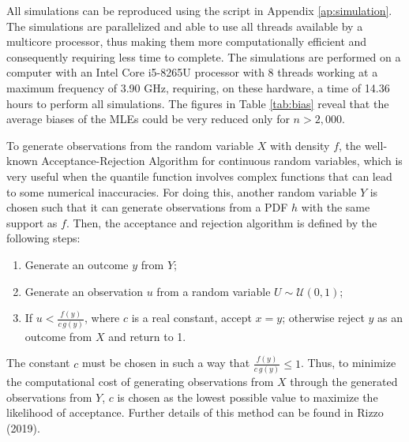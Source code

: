 \documentclass[twoside,leqno,11pt]{article}
\begin{document}
All simulations can be reproduced using the script in Appendix \ref{ap:simulation}. The simulations are parallelized and able to use all threads
available by a multicore processor, thus making them more computationally efficient and consequently requiring less time to complete.
The simulations are performed on a computer with an Intel Core i5-8265U processor with 8 threads working at a maximum frequency of 3.90 GHz,
requiring, on these hardware, a time of 14.36 hours to perform all simulations. The figures in Table \ref{tab:bias} reveal that the average
biases of the MLEs could be very reduced only for $n> 2,000$.

To generate observations from the random variable $X$ with density $f$, the well-known Acceptance-Rejection Algorithm for continuous random variables, which is very useful when the quantile function involves complex functions that can lead to some numerical inaccuracies. For doing this, another random variable $Y$ is chosen such that it can generate observations from a PDF $h$ with the same support as $f$. Then, the acceptance and rejection algorithm is defined by the following steps:
\begin{enumerate}
	\item Generate an outcome $y$ from $Y$;
	\item Generate an observation $u$ from a random variable $U\sim \mathcal{U}(0,1)$;
	\item If $u < \frac{f(y)}{c\, g(y)}$, where $c$ is a real constant, accept $x=y$; otherwise reject $y$ as an outcome from $X$ and return to 1.
\end{enumerate}

The constant $c$ must be chosen in such a way that $\frac{f(y)}{c \,g (y)}\leq 1 $. 
Thus, to minimize the computational cost of generating observations from $X$ through the generated observations from $Y$, $c$ is chosen 
as the lowest possible value to maximize the likelihood of acceptance. Further details of this method can be found in Rizzo (2019).
\end{document}
